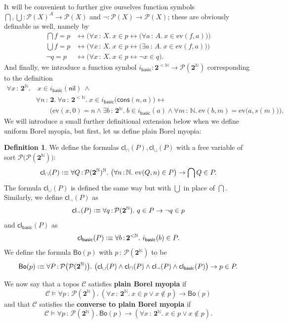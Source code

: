 \documentclass[11pt]{amsart}
\newcommand\basic{\mathsf{basic}}
\newcommand\Bo{\mathsf{Bo}}
\newcommand\cC{\mathcal{C}}
\newcommand\cl{\mathsf{cl}}
\newcommand\cons{\mathsf{cons}}
\newcommand\defequiv{\mathrel{\vcenter{\baselineskip0.7ex \lineskiplimit0pt \hbox{.}\hbox{.}}} \equiv}
\newcommand\defword[1]{\textbf{#1}}
\newcommand\ev{\mathrm{ev}}
\newcommand{\N}{\mathbb{N}}
\newcommand\nil{\mathsf{nil}}
\newcommand\pBig[1]{\Big({#1}\Big)}
\newcommand\pbig[1]{\big({#1}\big)}
\newcommand\pow{\mathcal{P}}
\newcommand\tolon{{\,:\,}}
\newcommand\tot{\leftrightarrow}
\newcommand\two{\mathbf{2}}
\theoremstyle{definition}
\newtheorem{defn}{Definition}[section]
\theoremstyle{remark}
\theoremstyle{plain}
\begin{document}
It will be convenient to further give ourselves function symbols \( \bigcap, \bigcup \colon \pow(X)^A \to \pow(X) \) and \( \neg \colon \pow(X) \to \pow(X) \); these are obviously definable as well, namely by
\[
  \begin{split}
    \bigcap f = p & \tot \pBig{\forall x \tolon X.\ x \in p \tot \pbig{\forall a \tolon A.\ x \in \ev(f, a)}} \\
    \bigcup f = p & \tot \pBig{\forall x \tolon X.\ x \in p \tot \pbig{\exists a \tolon A.\ x \in \ev(f, a)}} \\
    \neg q = p & \tot \pBig{\forall x \tolon X.\ x \in p \tot \neg x \in q}.
  \end{split}
\]
And finally, we introduce a function symbol \( i_{\basic} \colon \two^{<\N} \to \pow(\two^\N) \) corresponding to the definition
\[
  \begin{split}
    \forall x \tolon \two^\N.&\
    x \in i_{\basic}(\nil)
    \ \wedge\\
    & \forall n \tolon \two.\
    \forall a \tolon \two^{<\N}.\
    x \in i_{\basic} \pbig{\cons(n, a)} \tot \\
    & \qquad\pBig{
    \ev(x, 0) = n \wedge
    \exists b \tolon \two^\N.\
    b \in i_{\basic}(a) \wedge
    \forall m \tolon \N.\ \ev(b, m) = \ev\pbig{a, s(m)}
    }.
  \end{split}
\]
We will introduce a small further definitional extension below when we define uniform Borel myopia, but first, let us define plain Borel myopia:

\begin{defn}
  We define the formulas \( \cl_{\cap}(P), \cl_{\cup}(P) \) with a free variable of sort \( \pow\pbig{\pow(\two^\N)} \):
  \[
    \cl_\cap(P) \defequiv
    \forall Q \tolon \pow(\two^\N)^\N.\
    \pbig{\forall n \tolon \N.\
    \ev(Q, n) \in P} \to
    \bigcap Q \in P.
  \]
  The formula \( \cl_\cup(P) \) is defined the same way but with \( \bigcup \) in place of \( \bigcap \).
  Similarly, we define \( \cl_{\neg}(P) \) as
  \[
    \cl_{\neg}(P) \defequiv
    \forall q \tolon \pow(\two^\N).\
    q \in P \to \neg q \in p
  \]
  and \( \cl_{\basic}(P) \) as
  \[
    \cl_{\basic}(P) \defequiv
    \forall b \tolon \two^{<\N}.\
    i_{\basic}(b) \in P.
  \]
  We define the formula \( \Bo(p) \) with \( p \tolon \pow(\two^\N) \) to be
  \[
    \Bo(p) \defequiv
    \forall P \tolon \pow\pbig{\pow(\two^\N)}.\
    \pbig{
      \cl_{\cup}(P) \wedge \cl_{\cap}(P) \wedge \cl_{\neg}(P) \wedge \cl_{\basic}(P)
    } \to p \in P.
  \]

  We now say that a topos \( \cC \) satisfies \defword{plain Borel myopia} if
  \[
    \cC \vDash \forall p \tolon \pow(\two^\N).\
    (\forall x \tolon \two^\N.\ x \in p \vee x \notin p) \to
    \Bo(p)
  \]
  and that \( \cC \) satisfies the \defword{converse to plain Borel myopia} if
  \[
    \cC \vDash \forall p \tolon \pow(\two^\N).\
    \Bo(p) \to
    (\forall x \tolon \two^\N.\ x \in p \vee x \notin p).
  \]
\end{defn}
\end{document}
